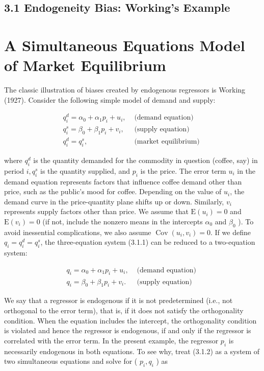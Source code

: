 \documentclass[10pt]{article}
\begin{document}
\subsection*{3.1 Endogeneity Bias: Working's Example}
\section*{A Simultaneous Equations Model of Market Equilibrium}
The classic illustration of biases created by endogenous regressors is Working (1927). Consider the following simple model of demand and supply:

\[
\begin{array}{cl}
q_{i}^{d}=\alpha_{0}+\alpha_{1} p_{i}+u_{i}, & \text { (demand equation) } \\
q_{i}^{s}=\beta_{0}+\beta_{1} p_{i}+v_{i}, & \text { (supply equation) } \\
q_{i}^{d}=q_{i}^{s}, & \text { (market equilibrium) } \tag{3.1.1c}
\end{array}
\]

where $q_{i}^{d}$ is the quantity demanded for the commodity in question (coffee, say) in period $i, q_{i}^{s}$ is the quantity supplied, and $p_{i}$ is the price. The error term $u_{i}$ in the demand equation represents factors that influence coffee demand other than price, such as the public's mood for coffee. Depending on the value of $u_{i}$, the demand curve in the price-quantity plane shifts up or down. Similarly, $v_{i}$ represents supply factors other than price. We assume that $\mathrm{E}\left(u_{i}\right)=0$ and $\mathrm{E}\left(v_{i}\right)=0$ (if not, include the nonzero means in the intercepts $\alpha_{0}$ and $\beta_{0}$ ). To avoid inessential complications, we also assume $\operatorname{Cov}\left(u_{i}, v_{i}\right)=0$. If we define $q_{i}=q_{i}^{d}=q_{i}^{s}$, the three-equation system (3.1.1) can be reduced to a two-equation system:

\[
\begin{array}{ll}
q_{i}=\alpha_{0}+\alpha_{1} p_{i}+u_{i}, & \text { (demand equation) } \\
q_{i}=\beta_{0}+\beta_{1} p_{i}+v_{i} . & \text { (supply equation) } \tag{3.1.2b}
\end{array}
\]

We say that a regressor is endogenous if it is not predetermined (i.e., not orthogonal to the error term), that is, if it does not satisfy the orthogonality condition. When the equation includes the intercept, the orthogonality condition is violated and hence the regressor is endogenous, if and only if the regressor is correlated with the error term. In the present example, the regressor $p_{i}$ is necessarily endogenous in both equations. To see why, treat (3.1.2) as a system of two simultaneous equations and solve for ( $p_{i}, q_{i}$ ) as
\end{document}
